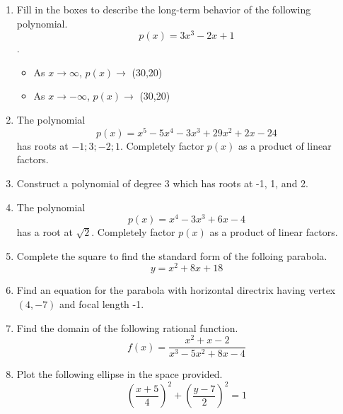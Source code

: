 \documentclass{article}
\begin{document}
\TestTitle[class={College Algebra}, name={Test 3}, term={Spring}, date={Oct. 19}, year={2015}, form={A}]

\AlgebraFacts[geom={show}]

\begin{enumerate}
\item Fill in the boxes to describe the long-term behavior of the following polynomial. \[ p(x) = 3x^3 - 2x + 1 \].

\begin{itemize}
\item As $x \rightarrow \infty$, $p(x) \rightarrow$ \framebox(30,20){} \vspace{0.5cm}
\item As $x \rightarrow -\infty$, $p(x) \rightarrow$ \framebox(30,20){}
\end{itemize} \vspace{1cm}

\item The polynomial \[ p(x) = x^5 - 5x^4 - 3x^3 + 29x^2 + 2x - 24 \] has roots at ${-1;3;-2;1}$. Completely factor $p(x)$ as a product of linear factors. \vspace{6cm}

\item Construct a polynomial of degree 3 which has roots at -1, 1, and 2. \vspace{5cm}

\newpage

\item The polynomial \[ p(x) = x^4 - 3x^3 + 6x - 4 \] has a root at $\sqrt{2}$. Completely factor $p(x)$ as a product of linear factors. \vspace{9cm}

\item Complete the square to find the standard form of the folloing parabola. \[ y = x^2 + 8x + 18 \] \vspace{6cm}

\item Find an equation for the parabola with horizontal directrix having vertex $(4, -7)$ and focal length -1. \vspace{2cm}

\newpage

\item Find the domain of the following rational function. \[ f(x) = \frac{x^2 + x - 2}{x^3 - 5x^2 + 8x - 4} \] \vspace{5cm}

\item Plot the following ellipse in the space provided. \[ \left(\frac{x + 5}{4}\right)^2 + \left(\frac{y - 7}{2}\right)^2 = 1 \]


\end{enumerate}
\end{document}
